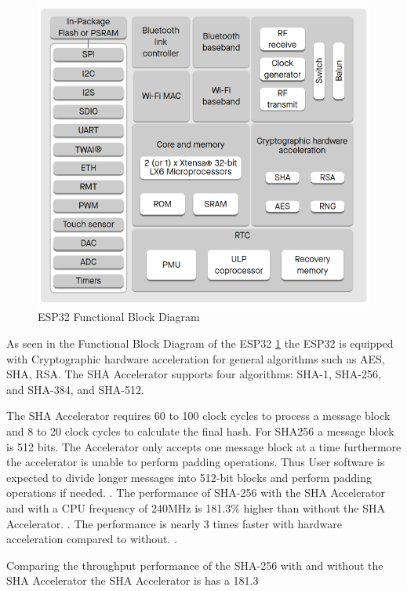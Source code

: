 \begin{figure}
	\centering
	\includegraphics[scale=.5]{abbildungen/functional-block-diagram}
	\caption{ESP32 Functional Block Diagram}
	\label{Fig:esp32-crypto}
\end{figure}
As seen in the Functional Block Diagram of the ESP32 \ref{Fig:esp32-crypto} the ESP32 is equipped with Cryptographic hardware acceleration for general algorithms such as AES, SHA, RSA. The SHA Accelerator supports four algorithms: SHA-1, SHA-256, and SHA-384, and SHA-512. 

The SHA Accelerator requires 60 to 100 clock cycles to process a message block and 8 to 20 clock cycles to calculate the final hash. For SHA256 a message block is 512 bits. The Accelerator only accepts one message block at a time furthermore the accelerator is unable to perform padding operations. Thus User software is expected to divide longer messages into 512-bit blocks and perform padding operations if needed. \cite[2]{esp32-ds}. The performance of SHA-256 with the SHA Accelerator and with a CPU frequency of 240MHz is 181.3\% higher than without the SHA Accelerator. \cite[41]{performance-evaluation}. The performance is nearly 3 times faster with hardware acceleration compared to without. \cite[41-42]{performance-evaluation}.



Comparing the throughput performance of the SHA-256 with and without the SHA Accelerator the SHA Accelerator is has a 181.3%






